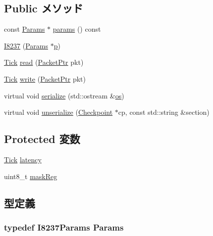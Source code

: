 \subsection*{Public メソッド}
\begin{DoxyCompactItemize}
\item 
const \hyperlink{classX86ISA_1_1I8237_a0e2ad01c52d44a915b5dd253a99ad175}{Params} $\ast$ \hyperlink{classX86ISA_1_1I8237_acd3c3feb78ae7a8f88fe0f110a718dff}{params} () const 
\item 
\hyperlink{classX86ISA_1_1I8237_af0eeaf391b6f5fc24806aaf7f543bac8}{I8237} (\hyperlink{classX86ISA_1_1I8237_a0e2ad01c52d44a915b5dd253a99ad175}{Params} $\ast$\hyperlink{namespaceX86ISA_af675c1d542a25b96e11164b80809a856}{p})
\item 
\hyperlink{base_2types_8hh_a5c8ed81b7d238c9083e1037ba6d61643}{Tick} \hyperlink{classX86ISA_1_1I8237_a613ec7d5e1ec64f8d21fec78ae8e568e}{read} (\hyperlink{classPacket}{PacketPtr} pkt)
\item 
\hyperlink{base_2types_8hh_a5c8ed81b7d238c9083e1037ba6d61643}{Tick} \hyperlink{classX86ISA_1_1I8237_a4cefab464e72b5dd42c003a0a4341802}{write} (\hyperlink{classPacket}{PacketPtr} pkt)
\item 
virtual void \hyperlink{classX86ISA_1_1I8237_a53e036786d17361be4c7320d39c99b84}{serialize} (std::ostream \&\hyperlink{namespaceX86ISA_a6b6e6ba763e7eaf46ac5b6372ca98d30}{os})
\item 
virtual void \hyperlink{classX86ISA_1_1I8237_af22e5d6d660b97db37003ac61ac4ee49}{unserialize} (\hyperlink{classCheckpoint}{Checkpoint} $\ast$cp, const std::string \&section)
\end{DoxyCompactItemize}
\subsection*{Protected 変数}
\begin{DoxyCompactItemize}
\item 
\hyperlink{base_2types_8hh_a5c8ed81b7d238c9083e1037ba6d61643}{Tick} \hyperlink{classX86ISA_1_1I8237_ac8d8966078cc047949fd1bca8feb21b6}{latency}
\item 
uint8\_\-t \hyperlink{classX86ISA_1_1I8237_ae379a70bda13189c6429c4478c0da614}{maskReg}
\end{DoxyCompactItemize}


\subsection{型定義}
\hypertarget{classX86ISA_1_1I8237_a0e2ad01c52d44a915b5dd253a99ad175}{
\subsubsection[{Params}]{\setlength{\rightskip}{0pt plus 5cm}typedef I8237Params {\bf Params}}}
\label{classX86ISA_1_1I8237_a0e2ad01c52d44a915b5dd253a99ad175}


